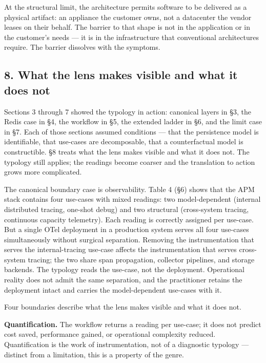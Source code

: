 \documentclass[
]{article}
\begin{document}
At the structural limit, the architecture permits software to be
delivered as a physical artifact: an appliance the customer owns, not a
datacenter the vendor leases on their behalf. The barrier to that shape
is not in the application or in the customer's needs --- it is in the
infrastructure that conventional architectures require. The barrier
dissolves with the symptoms.

\subsection{8. What the lens makes visible and what it does
not}\label{what-the-lens-makes-visible-and-what-it-does-not}

Sections 3 through 7 showed the typology in action: canonical layers in
§3, the Redis case in §4, the workflow in §5, the extended ladder in §6,
and the limit case in §7. Each of those sections assumed conditions ---
that the persistence model is identifiable, that use-cases are
decomposable, that a counterfactual model is constructible. §8 treats
what the lens makes visible and what it does not. The typology still
applies; the readings become coarser and the translation to action grows
more complicated.

The canonical boundary case is observability. Table 4 (§6) shows that
the APM stack contains four use-cases with mixed readings: two
model-dependent (internal distributed tracing, one-shot debug) and two
structural (cross-system tracing, continuous capacity telemetry). Each
reading is correctly assigned per use-case. But a single OTel deployment
in a production system serves all four use-cases simultaneously without
surgical separation. Removing the instrumentation that serves the
internal-tracing use-case affects the instrumentation that serves
cross-system tracing; the two share span propagation, collector
pipelines, and storage backends. The typology reads the use-case, not
the deployment. Operational reality does not admit the same separation,
and the practitioner retains the deployment intact and carries the
model-dependent use-cases with it.

Four boundaries describe what the lens makes visible and what it does
not.

\textbf{Quantification.} The workflow returns a reading per use-case; it
does not predict cost saved, performance gained, or operational
complexity reduced. Quantification is the work of instrumentation, not
of a diagnostic typology --- distinct from a limitation, this is a
property of the genre.
\end{document}

